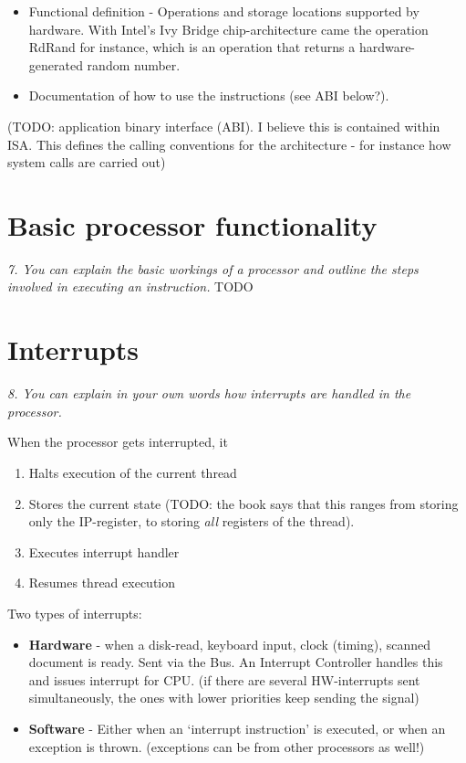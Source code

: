 \documentclass{article}
\begin{document}
\begin{itemize}
	\item Functional definition - Operations and storage locations supported by hardware. With Intel's Ivy Bridge chip-architecture came the operation RdRand for instance, which is an operation that returns a hardware-generated random number.
	\item Documentation of how to use the instructions (see ABI below?).
\end{itemize}

(TODO: application binary interface (ABI). I believe this is contained within ISA. This defines the calling conventions for the architecture - for instance how system calls are carried out)


\section{Basic processor functionality}
\emph{7. You can explain the basic workings of a processor and outline the steps involved in executing an instruction.}
TODO


\section{Interrupts}
\emph{8. You can explain in your own words how interrupts are handled in the processor.}

When the processor gets interrupted, it
\begin{enumerate}
	\item Halts execution of the current thread
	\item Stores the current state (TODO: the book says that this ranges from storing only the IP-register, to storing \emph{all} registers of the thread).
	\item Executes interrupt handler
	\item Resumes thread execution
\end{enumerate}

Two types of interrupts:
\begin{itemize}
	\item \textbf{Hardware} - when a disk-read, keyboard input, clock (timing), scanned document is ready. Sent via the Bus.
	An Interrupt Controller handles this and issues interrupt for CPU.
	(if there are several HW-interrupts sent simultaneously, the ones with lower priorities keep sending the signal)

	\item \textbf{Software} - Either when an `interrupt instruction' is executed, or when an exception is thrown. (exceptions can be from other processors as well!)

\end{itemize}
\end{document}
